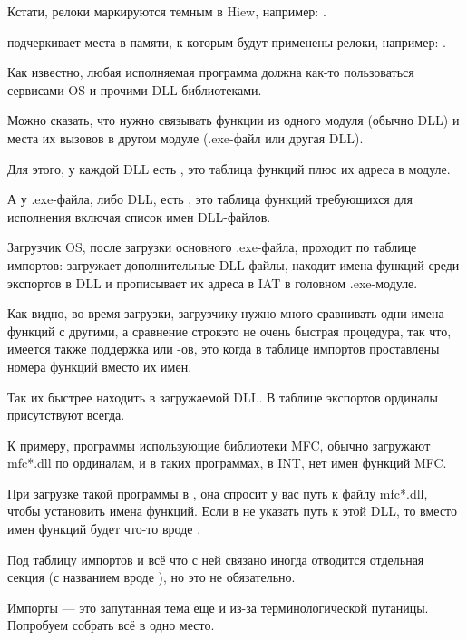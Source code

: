 Кстати, релоки маркируются темным в Hiew, например: .

\myindex{\olly}
\olly подчеркивает места в памяти, к которым будут применены релоки, например: .


\label{PE_exports_imports}
Как известно, любая исполняемая программа должна как-то пользоваться сервисами \ac{OS} и прочими DLL-библиотеками.

Можно сказать, что нужно связывать функции из одного модуля (обычно DLL) и места их вызовов в другом модуле (.exe-файл или другая DLL).

Для этого, у каждой DLL есть , это таблица функций плюс их адреса в модуле.

А у .exe-файла, либо DLL, есть , это таблица функций требующихся для исполнения
включая список имен DLL-файлов.

Загрузчик \ac{OS}, после загрузки основного .exe-файла, проходит по таблице импортов:
загружает дополнительные DLL-файлы, 
находит имена функций среди экспортов в DLL и прописывает их адреса в \ac{IAT} в головном .exe-модуле.

Как видно, во время загрузки, загрузчику нужно много сравнивать одни имена функций с другими,
а сравнение строк\EMDASH{}это не очень быстрая процедура, так что,
имеется также поддержка  или
-ов, это когда в таблице импортов проставлены номера функций вместо их имен.

Так их быстрее находить в загружаемой DLL.
В таблице экспортов ординалы присутствуют всегда.

К примеру, программы использующие библиотеки \ac{MFC}, обычно загружают mfc*.dll по ординалам, и в таких программах, в \ac{INT}, нет имен функций \ac{MFC}.

При загрузке такой программы в \IDA, она спросит у вас путь к файлу mfc*.dll,
чтобы установить имена функций.
Если в \IDA не указать путь к этой DLL, то вместо имен функций будет что-то вроде .


Под таблицу импортов и всё что с ней связано иногда отводится отдельная секция 
(с названием вроде ),
но это не обязательно.

Импорты --- это запутанная тема еще и из-за терминологической путаницы. Попробуем собрать всё в одно место.

